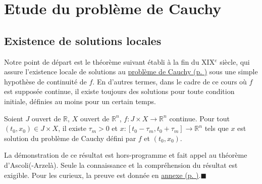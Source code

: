 \hypertarget{etude-du-probluxe8me-de-cauchy}{%
\chapter{Etude du problème de
Cauchy}\label{etude-du-probluxe8me-de-cauchy}}

\hypertarget{existence-de-solutions-locales}{%
\section{Existence de solutions
locales}\label{existence-de-solutions-locales}}

Notre point de départ est le théorème suivant établi à la fin du
XIX\(^e\) siècle, qui assure l'existence locale de solutions au
\protect\hyperlink{def_cauchy}{problème de Cauchy (p.
\pageref*{def_cauchy})} sous une simple hypothèse de continuité de
\(f\). En d'autres termes, dans le cadre de ce cours où \(f\) est
supposée continue, il existe toujours des solutions pour toute condition
initiale, définies au moins pour un certain temps.

\hypertarget{theo_peano}{}
\begin{theoreme}\label{theo_peano}
Soient \(J\) ouvert de \(\mathbb{R}\), \(X\) ouvert de
\(\mathbb{R}^{n}\), \(f: J\times X \to \mathbb{R}^n\) continue. Pour
tout \((t_0,x_0)\in J\times X\), il existe \(\tau_m >0\) et
\(x :[t_0-\tau_m,t_0+\tau_m]\to\mathbb{R}^n\) tels que \(x\) est
solution du problème de Cauchy défini par \(f\) et \((t_0,x_0)\).
\end{theoreme}

\hypertarget{duxe9monstration-1}{}
\begin{preuve}\label{duxe9monstration-1}
La démonstration de ce résultat est hors-programme et fait appel au
théorème d'Ascoli(-Arzelà). Seule la connaissance et la compréhension du
résultat est exigible. Pour les curieux, la preuve est donnée en
\protect\hyperlink{app_peano}{annexe (p.
\pageref*{app_peano})}.\hfill$\blacksquare$
\end{preuve}

